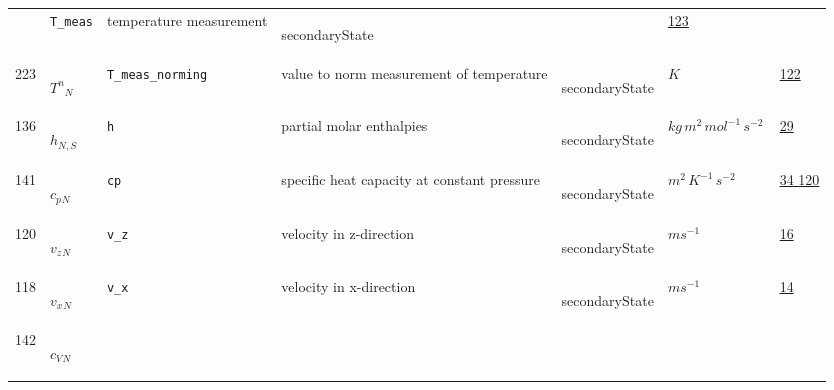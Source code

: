 \begin{longtable}{|p{1cm}|p{2.5cm}|p{4.5cm}|p{8cm}|p{3.0cm}|p{3cm}|p{1cm}|}
             & \verb|T_meas|
             & temperature measurement
             & \begin{lay}secondaryState \end{lay}
             & $  $
             &                 \hyperlink{"e:123"}{ 123 }
                 \\
            223
             & \hypertarget{"v:223"}{ $ {{T^n}}{_{N}} $}
             & \verb|T_meas_norming|
             & value to norm measurement of temperature
             & \begin{lay}secondaryState \end{lay}
             & $ K \, $
             &                 \hyperlink{"e:122"}{ 122 }
                 \\
            136
             & \hypertarget{"v:136"}{ $ {h}{_{N, S}} $}
             & \verb|h|
             & partial molar enthalpies
             & \begin{lay}secondaryState \end{lay}
             & $ kg \,m^{2} \,mol^{-1} \,s^{-2} \, $
             &                 \hyperlink{"e:29"}{ 29 }
                 \\
            141
             & \hypertarget{"v:141"}{ $ {{c_p}}{_{N}} $}
             & \verb|cp|
             & specific heat capacity at constant pressure
             & \begin{lay}secondaryState \end{lay}
             & $ m^{2} \,K^{-1} \,s^{-2} \, $
             &                 \hyperlink{"e:34"}{ 34 }
                                 \hyperlink{"e:120"}{ 120 }
                 \\
            120
             & \hypertarget{"v:120"}{ $ {{v_z}}{_{N}} $}
             & \verb|v_z|
             & velocity in z-direction
             & \begin{lay}secondaryState \end{lay}
             & $ m s^{-1} \, $
             &                 \hyperlink{"e:16"}{ 16 }
                 \\
            118
             & \hypertarget{"v:118"}{ $ {{v_x}}{_{N}} $}
             & \verb|v_x|
             & velocity in x-direction
             & \begin{lay}secondaryState \end{lay}
             & $ m s^{-1} \, $
             &                 \hyperlink{"e:14"}{ 14 }
                 \\
            142
             & \hypertarget{"v:142"}{ $ {{c_V}}{_{N}} $}

\end{longtable}
